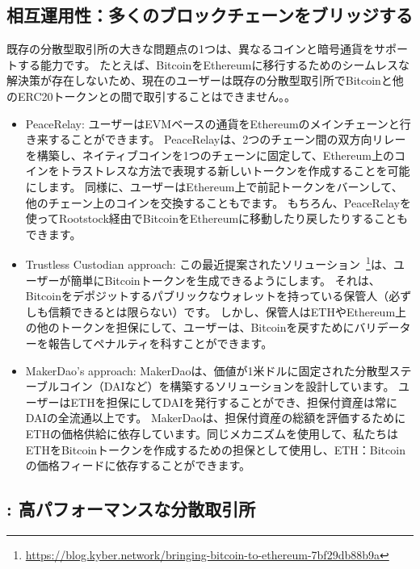 \subsection{相互運用性：多くのブロックチェーンをブリッジする}

既存の分散型取引所の大きな問題点の1つは、異なるコインと暗号通貨をサポートする能力です。 たとえば、BitcoinをEthereumに移行するためのシームレスな解決策が存在しないため、現在のユーザーは既存の分散型取引所でBitcoinと他のERC20トークンとの間で取引することはできません。。

\begin{itemize}

\item PeaceRelay: ユーザーはEVMベースの通貨をEthereumのメインチェーンと行き来することができます。 PeaceRelayは、2つのチェーン間の双方向リレーを構築し、ネイティブコインを1つのチェーンに固定して、Ethereum上のコインをトラストレスな方法で表現する新しいトークンを作成することを可能にします。 同様に、ユーザーはEthereum上で前記トークンをバーンして、他のチェーン上のコインを交換することもでます。 もちろん、PeaceRelayを使ってRootstock経由でBitcoinをEthereumに移動したり戻したりすることもできます。

\item Trustless Custodian approach: この最近提案されたソリューション~\footnote{\url{https://blog.kyber.network/bringing-bitcoin-to-ethereum-7bf29db88b9a}}は、ユーザーが簡単にBitcoinトークンを生成できるようにします。 それは、Bitcoinをデポジットするパブリックなウォレットを持っている保管人（必ずしも信頼できるとは限らない）です。 しかし、保管人はETHやEthereum上の他のトークンを担保にして、ユーザーは、Bitcoinを戻すためにバリデーターを報告してペナルティを科すことができます。

\item MakerDao’s approach: MakerDaoは、価値が1米ドルに固定された分散型ステーブルコイン（DAIなど）を構築するソリューションを設計しています。 ユーザーはETHを担保にしてDAIを発行することができ、担保付資産は常にDAIの全流通以上です。 MakerDaoは、担保付資産の総額を評価するためにETHの価格供給に依存しています。同じメカニズムを使用して、私たちはETHをBitcoinトークンを作成するための担保として使用し、ETH：Bitcoinの価格フィードに依存することができます。
\end{itemize}

\subsection{\codename: 高パフォーマンスな分散取引所}

